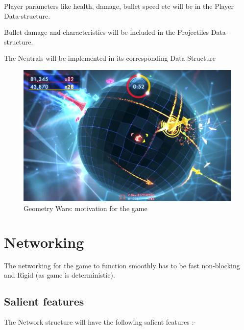 \documentclass[ebook,12pt,oneside,openany]{article}
\begin{document}
Player parameters like health, damage, bullet speed etc will be in the Player Data-structure.

Bullet damage and characteristics will be included in the Projectiles Data-structure.

The Neutrals will be implemented in its corresponding Data-Structure

\begin{figure}[ht!]
\centering
\includegraphics[width=150mm]{geometry_wars.png}
\caption{Geometry Wars: motivation for the game\label{overflow}}
\end{figure}

\section{Networking}
The networking for the game to function smoothly has to be fast non-blocking and Rigid (as game is deterministic).
\subsection{Salient features}
The Network structure will have the following salient features :-
\end{document}
